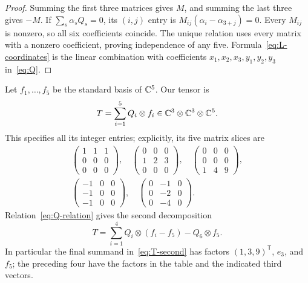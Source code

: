 \begin{proof}
Summing the first three matrices gives $M$, and summing the last
three gives $-M$. If $\sum_s\alpha_s Q_s=0$, its $(i,j)$ entry is
$M_{ij}(\alpha_i-\alpha_{3+j})=0$. Every $M_{ij}$ is nonzero,
so all six coefficients coincide. The unique relation uses every
matrix with a nonzero coefficient, proving independence of any five.
Formula~\eqref{eq:L-coordinates} is the linear combination with
coefficients $x_1,x_2,x_3,y_1,y_2,y_3$ in~\eqref{eq:Q}.
\end{proof}

Let $f_1,\ldots,f_5$ be the standard basis of $\mathbb C^5$. Our tensor is
\begin{equation}\label{eq:T-first}
 T=\sum_{i=1}^5 Q_i\otimes f_i
   \in\mathbb C^3\otimes\mathbb C^3\otimes\mathbb C^5.
\end{equation}
This specifies all its integer entries; explicitly, its five matrix
slices are
\begin{equation}\label{eq:slices}
\begin{gathered}
 \begin{pmatrix}1&1&1\\0&0&0\\0&0&0\end{pmatrix},\quad
 \begin{pmatrix}0&0&0\\1&2&3\\0&0&0\end{pmatrix},\quad
 \begin{pmatrix}0&0&0\\0&0&0\\1&4&9\end{pmatrix},\\[3pt]
 \begin{pmatrix}-1&0&0\\-1&0&0\\-1&0&0\end{pmatrix},\quad
 \begin{pmatrix}0&-1&0\\0&-2&0\\0&-4&0\end{pmatrix}.
\end{gathered}
\end{equation}
Relation~\eqref{eq:Q-relation} gives the second decomposition
\begin{equation}\label{eq:T-second}
 T=\sum_{i=1}^4 Q_i\otimes(f_i-f_5)-Q_6\otimes f_5.
\end{equation}
In particular the final summand in~\eqref{eq:T-second} has factors
$(1,3,9)^{\mathsf T}$, $e_3$, and $f_5$; the preceding four have
the factors in the table and the indicated third vectors.

